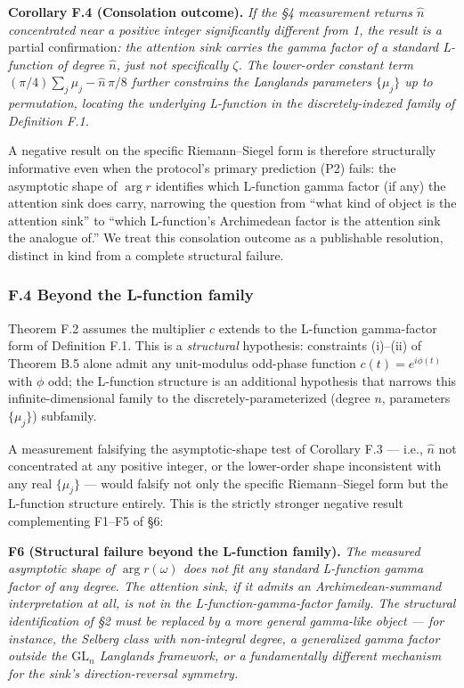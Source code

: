 \documentclass[
  letterpaper,
  11pt]{article}
\theoremstyle{plain}
\theoremstyle{definition}
\theoremstyle{remark}
\begin{document}
\textbf{Corollary F.4 (Consolation outcome).} \emph{If the §4 measurement returns \(\hat n\) concentrated near a positive integer significantly different from 1, the result is a} partial confirmation\emph{: the attention sink carries the gamma factor of a standard L-function of degree \(\hat n\), just not specifically \(\zeta\). The lower-order constant term \((\pi/4)\sum_j \mu_j - \hat n\,\pi/8\) further constrains the Langlands parameters \(\{\mu_j\}\) up to permutation, locating the underlying L-function in the discretely-indexed family of Definition F.1.}

A negative result on the specific Riemann--Siegel form is therefore structurally informative even when the protocol's primary prediction (P2) fails: the asymptotic shape of \(\arg r\) identifies which L-function gamma factor (if any) the attention sink does carry, narrowing the question from ``what kind of object is the attention sink'' to ``which L-function's Archimedean factor is the attention sink the analogue of.'' We treat this consolation outcome as a publishable resolution, distinct in kind from a complete structural failure.

\subsubsection{F.4 Beyond the L-function family}\label{f.4-beyond-the-l-function-family}

Theorem F.2 assumes the multiplier \(c\) extends to the L-function gamma-factor form of Definition F.1. This is a \emph{structural} hypothesis: constraints (i)--(ii) of Theorem B.5 alone admit any unit-modulus odd-phase function \(c(t) = e^{i\phi(t)}\) with \(\phi\) odd; the L-function structure is an additional hypothesis that narrows this infinite-dimensional family to the discretely-parameterized (degree \(n\), parameters \(\{\mu_j\}\)) subfamily.

A measurement falsifying the asymptotic-shape test of Corollary F.3 --- i.e., \(\hat n\) not concentrated at any positive integer, or the lower-order shape inconsistent with any real \(\{\mu_j\}\) --- would falsify not only the specific Riemann--Siegel form but the L-function structure entirely. This is the strictly stronger negative result complementing F1--F5 of §6:

\textbf{F6 (Structural failure beyond the L-function family).} \emph{The measured asymptotic shape of \(\arg r(\omega)\) does not fit any standard L-function gamma factor of any degree. The attention sink, if it admits an Archimedean-summand interpretation at all, is not in the L-function-gamma-factor family. The structural identification of §2 must be replaced by a more general gamma-like object --- for instance, the Selberg class with non-integral degree, a generalized gamma factor outside the \(\mathrm{GL}_n\) Langlands framework, or a fundamentally different mechanism for the sink's direction-reversal symmetry.}
\end{document}
